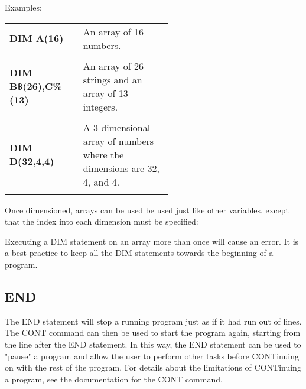 Examples:\\

\begin{tabular}{l p{0.55\linewidth}}

	{\ttfamily\bfseries DIM A(16)}&An array of 16 numbers.\\\\

	{\ttfamily\bfseries DIM B\$(26),C\%(13)}&An array of 26 strings and an
	array of 13 integers.\\\\

	{\ttfamily\bfseries DIM D(32,4,4)}&A 3-dimensional array of numbers where
	the dimensions are 32, 4, and 4.\\\\

\end{tabular}

Once dimensioned, arrays can be used be used just like other variables, except
that the index into each dimension must be specified:\\


Executing a {\ttfamily DIM} statement on an array more than once will cause an
error.  It is a best practice to keep all the {\ttfamily DIM} statements
towards the beginning of a program.\\

\subsection{END}

The {\ttfamily END} statement will stop a running program just as if it had run
out of lines.  The {\ttfamily CONT} command can then be used to start the
program again, starting from the line after the {\ttfamily END} statement.  In
this way, the {\ttfamily END} statement can be used to "pause" a program and
allow the user to perform other tasks before {\ttfamily CONT}inuing on with the
rest of the program.  For details about the limitations of {\ttfamily
CONT}inuing a program, see the documentation for the {\ttfamily CONT}
command.\\

